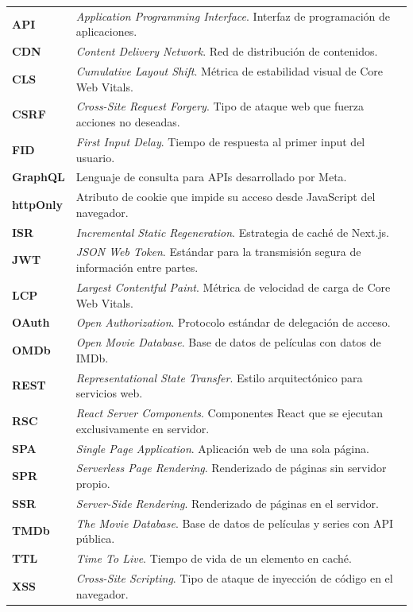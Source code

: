 
\renewcommand{\arraystretch}{1.5}

\begin{longtable}{l p{13.7cm}}
\textbf{API} & \textit{Application Programming Interface}. Interfaz de programación de aplicaciones. \\
\textbf{CDN} & \textit{Content Delivery Network}. Red de distribución de contenidos. \\
\textbf{CLS} & \textit{Cumulative Layout Shift}. Métrica de estabilidad visual de Core Web Vitals. \\
\textbf{CSRF} & \textit{Cross-Site Request Forgery}. Tipo de ataque web que fuerza acciones no deseadas. \\
\textbf{FID} & \textit{First Input Delay}. Tiempo de respuesta al primer input del usuario. \\
\textbf{GraphQL} & Lenguaje de consulta para APIs desarrollado por Meta. \\
\textbf{httpOnly} & Atributo de cookie que impide su acceso desde JavaScript del navegador. \\
\textbf{ISR} & \textit{Incremental Static Regeneration}. Estrategia de caché de Next.js. \\
\textbf{JWT} & \textit{JSON Web Token}. Estándar para la transmisión segura de información entre partes. \\
\textbf{LCP} & \textit{Largest Contentful Paint}. Métrica de velocidad de carga de Core Web Vitals. \\
\textbf{OAuth} & \textit{Open Authorization}. Protocolo estándar de delegación de acceso. \\
\textbf{OMDb} & \textit{Open Movie Database}. Base de datos de películas con datos de IMDb. \\
\textbf{REST} & \textit{Representational State Transfer}. Estilo arquitectónico para servicios web. \\
\textbf{RSC} & \textit{React Server Components}. Componentes React que se ejecutan exclusivamente en servidor. \\
\textbf{SPA} & \textit{Single Page Application}. Aplicación web de una sola página. \\
\textbf{SPR} & \textit{Serverless Page Rendering}. Renderizado de páginas sin servidor propio. \\
\textbf{SSR} & \textit{Server-Side Rendering}. Renderizado de páginas en el servidor. \\
\textbf{TMDb} & \textit{The Movie Database}. Base de datos de películas y series con API pública. \\
\textbf{TTL} & \textit{Time To Live}. Tiempo de vida de un elemento en caché. \\
\textbf{XSS} & \textit{Cross-Site Scripting}. Tipo de ataque de inyección de código en el navegador. \\
\end{longtable}
